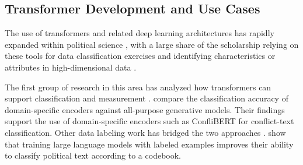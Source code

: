 \documentclass[11pt, letterpaper]{article}
\begin{document}
\subsection{Transformer Development and Use Cases}
The use of transformers and related deep learning architectures has rapidly expanded within political science \citep{hu2022conflibert, brandt2026extractive, halterman2025synthetic}, with a large share of the scholarship relying on these tools for data classification exercises \citep{timoneda2025bert, laurer2024less, sui2026high} and identifying characteristics or attributes in high-dimensional data \citep{tarr2023automated, zhang2019casm}.

The first group of research in this area has analyzed how transformers can support classification and measurement \citep{heseltine2024large, dileo2025mapping, halterman2025synthetic, choi2026finetuned}. \cite{brandt2026extractive} compare the classification accuracy of domain-specific encoders against all-purpose generative models. Their findings support the use of domain-specific encoders such as ConfliBERT for conflict-text classification. %
Other data labeling work has bridged the two approaches \citep{laurer2024less, burnham2026debate, halterman2026codebook}. \cite{halterman2026codebook} show that training large language models with labeled examples improves their ability to classify political text according to a codebook.

\end{document}
